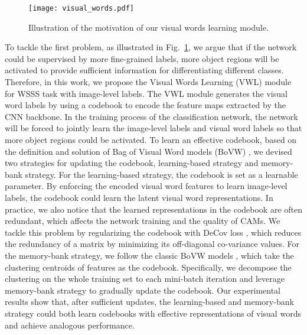 \begin{figure}[tbp]
  \centering
  \texttt{[image: visual\_words.pdf]}
  \caption{Illustration of the motivation of our visual words learning module. }
  \label{fig_visual_words}
\end{figure}

\par To tackle the first problem, as illustrated in Fig.~\ref{fig_visual_words}, we argue that if the network could be supervised by more fine-grained labels, more object regions will be activated to provide sufficient information for differentiating different classes. Therefore, in this work, we propose the Visual Words Learning (VWL) module for WSSS task with image-level labels. The VWL module generates the visual word labels by using a codebook to encode the feature maps extracted by the CNN backbone. In the training process of the classification network, the network will be forced to jointly learn the image-level labels and visual word labels so that more object regions could be activated. To learn an effective codebook, based on the definition and solution of Bag of Visual Word models (BoVW) \citep{arandjelovic2017netvlad,passalis2017learning}, we devised two strategies for updating the codebook, \ie learning-based strategy and memory-bank strategy. For the learning-based strategy, the codebook is set as a learnable parameter. By enforcing the encoded visual word features to learn image-level labels, the codebook could learn the latent visual word representations. In practice, we also notice that the learned representations in the codebook are often redundant, which affects the network training and the quality of CAMs. We tackle this problem by regularizing the codebook with DeCov loss \citep{cogswell2015reducing}, which reduces the redundancy of a matrix by minimizing its off-diagonal co-variance values. For the memory-bank strategy, we follow the classic BoVW models \citep{liu2019bow,gidaris2020learning}, which take the clustering centroids of features as the codebook. Specifically, we decompose the clustering on the whole training set to each mini-batch iteration and leverage memory-bank strategy \citep{wu2018unsupervised,zhuang2019local} to gradually update the codebook. Our experimental results show that, after sufficient updates, the learning-based and memory-bank strategy could both learn codebooks with effective representations of visual words and achieve analogous performance.

